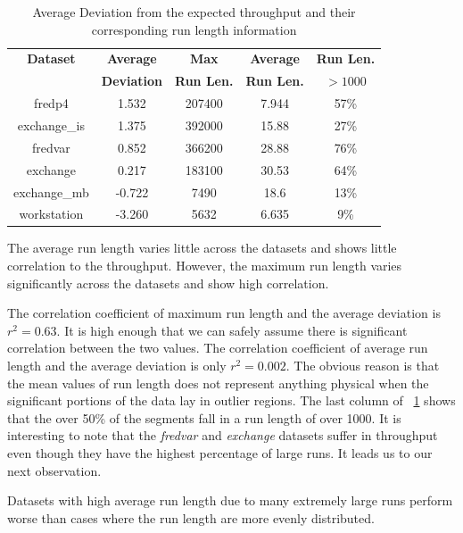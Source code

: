 \begin{table}[!t]
\renewcommand{\arraystretch}{1.3}
\caption{Average Deviation from the expected throughput and their corresponding run length information}
\label{dev}
\centering
\begin{tabular}{c||c c c c}
\hline
\bfseries Dataset 	&\bfseries Average	&\bfseries Max		&\bfseries Average	&\bfseries Run Len.	\\
 			&\bfseries Deviation 	&\bfseries Run Len.	&\bfseries Run Len.	&\bfseries $> 1000$	\\		
\hline\hline
fredp4		&1.532			&207400			&7.944			&57\%			\\
exchange\_is	&1.375			&392000			&15.88			&27\%			\\
fredvar		&0.852			&366200			&28.88			&76\%			\\
exchange 		&0.217			&183100			&30.53			&64\%			\\
exchange\_mb 	&-0.722			&7490			&18.6				&13\%			\\
workstation		&-3.260			&5632			&6.635			&9\%				\\			
\hline
\end{tabular}
\end{table}

\begin{observation}
The average run length varies little across the datasets and shows little correlation to the throughput. However, the maximum run length varies significantly across the datasets and show high correlation.
\end{observation}

The correlation coefficient of maximum run length and the average deviation is $r^2 = 0.63$. It is high enough that we can safely assume there is significant correlation between the two values. The correlation coefficient of average run length and the average deviation is only $r^2 = 0.002$. The obvious reason is that the mean values of run length does not represent anything physical when the significant portions of the data lay in outlier regions. The last column of \tablename~\ref{dev} shows that the over 50\% of the segments fall in a run length of over 1000. It is interesting to note that the \emph{fredvar} and \emph{exchange} datasets suffer in throughput even though they have the highest percentage of large runs. It leads us to our next observation.

\begin{observation}
Datasets with high average run length due to many extremely large runs perform worse than cases where the run length are more evenly distributed. 
\end{observation}

